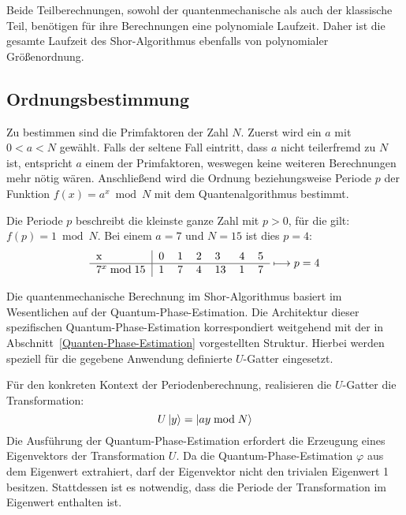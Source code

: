 Beide Teilberechnungen, sowohl der quantenmechanische als auch der klassische Teil, 
benötigen für ihre Berechnungen eine polynomiale Laufzeit. 
Daher ist die gesamte Laufzeit des Shor-Algorithmus ebenfalls von polynomialer Größenordnung.

\subsection{Ordnungsbestimmung} \label{Shor:Ordnungsbestimmung}
Zu bestimmen sind die Primfaktoren der Zahl \(N\).
Zuerst wird ein \(a\) mit \(0 < a < N\) gewählt.
Falls der seltene Fall eintritt, dass \(a\) nicht teilerfremd zu \(N\) ist, entspricht \(a\) einem der Primfaktoren, weswegen 
keine weiteren Berechnungen mehr nötig wären.
Anschließend wird die Ordnung beziehungsweise Periode \(p\) der Funktion \({f(x) = a^x \bmod N}\) mit dem Quantenalgorithmus bestimmt.

Die Periode \(p\) beschreibt die kleinste ganze Zahl mit \({p > 0}\), für die gilt: \({f(p) = 1 \bmod N}\).
Bei einem \(a = 7\) und \(N = 15\) ist dies \(p=4\):
\[
\begin{tabular}{l|llllll}
    x     &     0     &     1       &     2      &      3   &  4 &  5  \\ \hline
    \(7^x \bmod 15\)    &      1     &        7     &       4     &     13     &  1 &  7 
\end{tabular} \longmapsto p = 4
\]

Die quantenmechanische Berechnung im Shor-Algorithmus basiert im Wesentlichen auf der Quantum-Phase-Estimation.
Die Architektur dieser spezifischen Quantum-Phase-Estimation korrespondiert weitgehend mit der in Abschnitt~\ref{Quanten-Phase-Estimation} vorgestellten Struktur.
Hierbei werden speziell für die gegebene Anwendung definierte \(U\)-Gatter eingesetzt.

Für den konkreten Kontext der Periodenberechnung, realisieren die \(U\)-Gatter die Transformation:
\[U\ket{y} = \ket{ay \bmod N}\] 
Die Ausführung der Quantum-Phase-Estimation erfordert die Erzeugung eines Eigenvektors der Transformation \(U\).
Da die Quantum-Phase-Estimation \(\varphi\) aus dem Eigenwert extrahiert, 
darf der Eigenvektor nicht den trivialen Eigenwert 1 besitzen.
Stattdessen ist es notwendig, dass die Periode der Transformation im Eigenwert enthalten ist.

